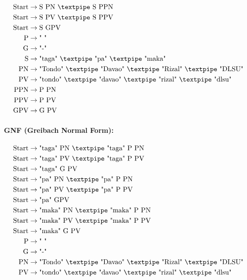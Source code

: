 \begin{equation*}
    \begin{aligned}
        \text{Start}  & \rightarrow \text{S PN {\textpipe} S PPN}   \\
        \text{Start}  & \rightarrow \text{S PV {\textpipe} S PPV}   \\
        \text{Start}  & \rightarrow \text{S GPV}   \\
        \text{P}   & \rightarrow \text{" "}\\
        \text{G} & \rightarrow \text{"-"}\\        
        \text{S}    & \rightarrow \text{"taga" {\textpipe} "pa" {\textpipe} "maka"}\\
        \text{PN} & \rightarrow \text{"Tondo" {\textpipe} "Davao" {\textpipe} "Rizal" {\textpipe} "DLSU"}   \\
        \text{PV} & \rightarrow \text{"tondo" {\textpipe} "davao" {\textpipe} "rizal" {\textpipe} "dlsu"}   \\
        \text{PPN} & \rightarrow \text{P PN}   \\
        \text{PPV} & \rightarrow \text{P PV}  \\
        \text{GPV} & \rightarrow \text{G PV}  
    \end{aligned}
\end{equation*}

\paragraph{GNF (Greibach Normal Form):}

\begin{equation*}
    \begin{aligned}
        \text{Start}  & \rightarrow \text{"taga" PN {\textpipe} "taga" P PN}   \\
        \text{Start}  & \rightarrow \text{"taga" PV {\textpipe} "taga" P PV}   \\
        \text{Start}  & \rightarrow \text{"taga" G PV}   \\
        \text{Start}  & \rightarrow \text{"pa" PN {\textpipe} "pa" P PN}   \\
        \text{Start}  & \rightarrow \text{"pa" PV {\textpipe} "pa" P PV}   \\
        \text{Start}  & \rightarrow \text{"pa" GPV}   \\
        \text{Start}  & \rightarrow \text{"maka" PN {\textpipe} "maka" P PN}   \\
        \text{Start}  & \rightarrow \text{"maka" PV {\textpipe} "maka" P PV}   \\
        \text{Start}  & \rightarrow \text{"maka" G PV}   \\
        \text{P}   & \rightarrow \text{" "}\\
        \text{G} & \rightarrow \text{"-"}\\        
        \text{PN} & \rightarrow \text{"Tondo" {\textpipe} "Davao" {\textpipe} "Rizal" {\textpipe} "DLSU"}   \\
        \text{PV} & \rightarrow \text{"tondo" {\textpipe} "davao" {\textpipe} "rizal" {\textpipe} "dlsu"}   
    \end{aligned}
\end{equation*}


